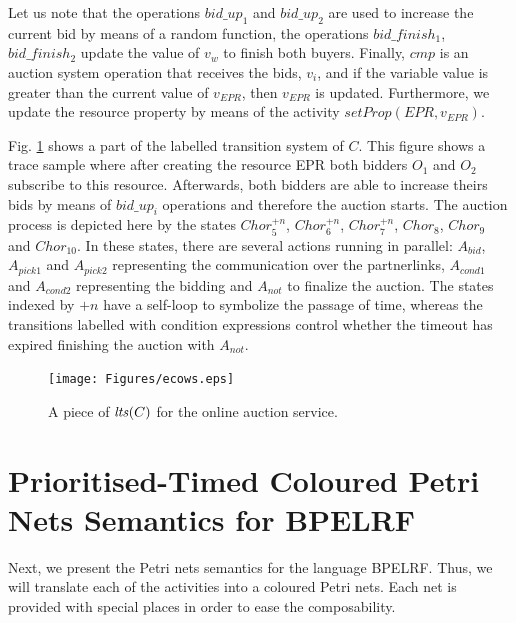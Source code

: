 \normalsize
\vspace{-1.0cm}

Let us note that the operations $bid\_up_{1}$ and $bid\_up_{2}$ are used to increase the current bid by means of a random function, the operations $bid\_finish_{1}$, $bid\_finish_{2}$ update the value of $v_w$ to finish both buyers. Finally, $cmp$ is an auction system operation that receives the bids, $v_i$, and if the variable value is greater than the current value of $v_{EPR}$, then $v_{EPR}$ is updated. Furthermore, we update the resource property by means of the activity $setProp(EPR,v_{EPR})$.

Fig. \ref{auct} shows a part of the labelled transition system of $C$. This figure shows a trace sample where after creating the resource EPR both bidders $O_1$ and $O_2$ subscribe to this resource. Afterwards, both bidders are able to increase theirs bids by means of $bid\_up_i$ operations and therefore the auction starts. The auction process is depicted here by the states $Chor_{5}^{+n}$, $Chor_{6}^{+n}$, $Chor_{7}^{+n}$, $Chor_{8}$, $Chor_{9}$ and $Chor_{10}$. In these states, there are several actions running in parallel: $A_{bid}$, $A_{pick1}$ and $A_{pick2}$ representing the communication over the partnerlinks, $A_{cond1}$ and $A_{cond2}$ representing the bidding and $A_{not}$ to finalize the auction. The states indexed by $+n$ have a self-loop to symbolize the passage of time, whereas the transitions labelled with condition expressions control whether the timeout has expired finishing the auction with $A_{not}$.

\begin{figure}
\begin{center}
    \texttt{[image: Figures/ecows.eps]}
  \caption{A piece of ${\it lts}(C)$ for the online auction service.}
  \label{auct}
\end{center}
\end{figure}

\newpage

\section{Prioritised-Timed Coloured Petri Nets Semantics for BPELRF}\label{semantics}

Next, we present the Petri nets semantics for the language BPELRF. Thus, we will translate each of the activities into a coloured Petri nets. 
Each net is provided with special places in order to ease the composability.

